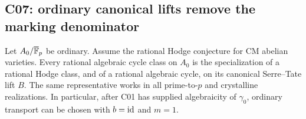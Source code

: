 \subsection{C07: ordinary canonical lifts remove the marking denominator}

\begin{proposition}[C07]
\label{prop:ordinary-transport}
Let $A_0/\overline{\mathbb F}_p$ be ordinary. Assume the rational Hodge conjecture for CM abelian varieties. Every rational algebraic cycle class on $A_0$ is the specialization of a rational Hodge class, and of a rational algebraic cycle, on its canonical Serre--Tate lift $B$. The same representative works in all prime-to-$p$ and crystalline realizations. In particular, after C01 has supplied algebraicity of $\gamma_0$, ordinary transport can be chosen with $b=\operatorname{id}$ and $m=1$.
\end{proposition}

